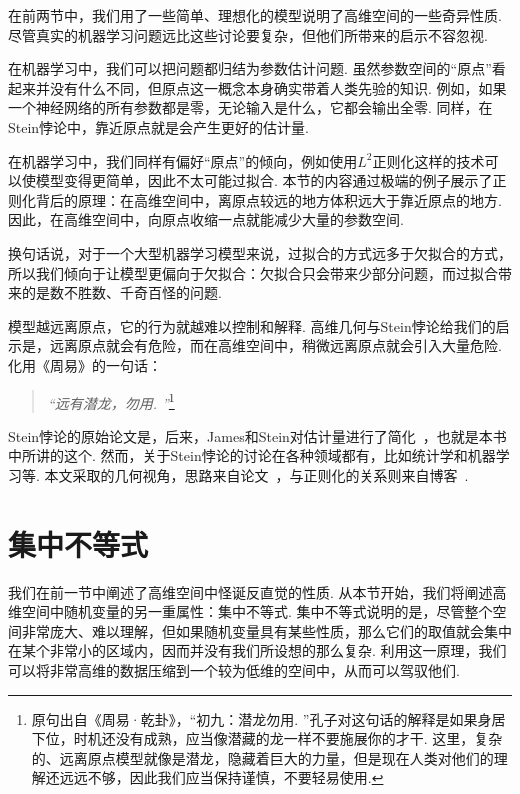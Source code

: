 在前两节中，我们用了一些简单、理想化的模型说明了高维空间的一些奇异性质. 尽管真实的机器学习问题远比这些讨论要复杂，但他们所带来的启示不容忽视. 

在机器学习中，我们可以把问题都归结为参数估计问题. 虽然参数空间的“原点”看起来并没有什么不同，但原点这一概念本身确实带着人类先验的知识. 例如，如果一个神经网络的所有参数都是零，无论输入是什么，它都会输出全零. 同样，在Stein悖论中，靠近原点就是会产生更好的估计量. 

在机器学习中，我们同样有偏好“原点”的倾向，例如使用$L^2$正则化这样的技术可以使模型变得更简单，因此不太可能过拟合. 本节的内容通过极端的例子展示了正则化背后的原理：在高维空间中，离原点较远的地方体积远大于靠近原点的地方. 因此，在高维空间中，向原点收缩一点就能减少大量的参数空间. 

换句话说，对于一个大型机器学习模型来说，过拟合的方式远多于欠拟合的方式，所以我们倾向于让模型更偏向于欠拟合：欠拟合只会带来少部分问题，而过拟合带来的是数不胜数、千奇百怪的问题. 

模型越远离原点，它的行为就越难以控制和解释. 高维几何与Stein悖论给我们的启示是，远离原点就会有危险，而在高维空间中，稍微远离原点就会引入大量危险. 化用《周易》的一句话：
\begin{quotation}
    \textit{“远有潜龙，勿用. ”}\footnote{原句出自《周易·乾卦》，“初九：潜龙勿用. ”孔子对这句话的解释是如果身居下位，时机还没有成熟，应当像潜藏的龙一样不要施展你的才干. 这里，复杂的、远离原点模型就像是潜龙，隐藏着巨大的力量，但是现在人类对他们的理解还远远不够，因此我们应当保持谨慎，不要轻易使用. }
\end{quotation}

\begin{remark}
    Stein悖论的原始论文是\cite{steinInadmissibilityUsualEstimator1956}，后来，James和Stein对估计量进行了简化~\cite{jamesEstimationQuadraticLoss1961}，也就是本书中所讲的这个. 然而，关于Stein悖论的讨论在各种领域都有，比如统计学和机器学习等. 本文采取的几何视角，思路来自论文~\cite{brownGeometricalExplanationStein2012}，与正则化的关系则来自博客~\cite{UnderstandingSteinsParadox}. 
\end{remark}

\section{集中不等式}

我们在前一节中阐述了高维空间中怪诞反直觉的性质. 从本节开始，我们将阐述高维空间中随机变量的另一重属性：集中不等式. 集中不等式说明的是，尽管整个空间非常庞大、难以理解，但如果随机变量具有某些性质，那么它们的取值就会集中在某个非常小的区域内，因而并没有我们所设想的那么复杂. 利用这一原理，我们可以将非常高维的数据压缩到一个较为低维的空间中，从而可以驾驭他们. 

